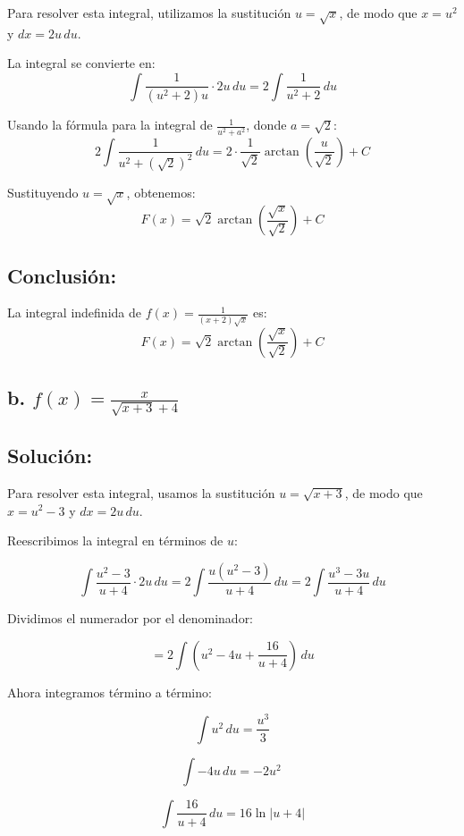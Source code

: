 \documentclass{article}
\begin{document}
Para resolver esta integral, utilizamos la sustitución \( u = \sqrt{x} \), de modo que \( x = u^2 \) y \( dx = 2u \, du \).

La integral se convierte en:
\[
\int \frac{1}{(u^2 + 2)u} \cdot 2u \, du = 2 \int \frac{1}{u^2 + 2} \, du
\]

Usando la fórmula para la integral de \( \frac{1}{u^2 + a^2} \), donde \( a = \sqrt{2} \):
\[
2 \int \frac{1}{u^2 + (\sqrt{2})^2} \, du = 2 \cdot \frac{1}{\sqrt{2}} \arctan\left( \frac{u}{\sqrt{2}} \right) + C
\]

Sustituyendo \( u = \sqrt{x} \), obtenemos:
\[
F(x) = \sqrt{2} \arctan\left( \frac{\sqrt{x}}{\sqrt{2}} \right) + C
\]

\subsection*{Conclusión:}

La integral indefinida de \( f(x) = \frac{1}{(x+2)\sqrt{x}} \) es:
\[
F(x) = \sqrt{2} \arctan\left( \frac{\sqrt{x}}{\sqrt{2}} \right) + C
\]

\subsection*{\newline b. \(f(x) = \frac{x}{\sqrt{x+3} + 4}\)}
\subsection*{Solución: }

Para resolver esta integral, usamos la sustitución \( u = \sqrt{x+3} \), de modo que \( x = u^2 - 3 \) y \( dx = 2u \, du \).

\noindent \newline Reescribimos la integral en términos de \( u \):

\[
\int \frac{u^2 - 3}{u + 4} \cdot 2u \, du = 2 \int \frac{u(u^2 - 3)}{u + 4} \, du = 2 \int \frac{u^3 - 3u}{u + 4} \, du
\]

\noindent Dividimos el numerador por el denominador:

\[
= 2 \int \left( u^2 - 4u + \frac{16}{u+4} \right) \, du
\]

\noindent Ahora integramos término a término:

\[
\int u^2 \, du = \frac{u^3}{3}
\]

\[
\int -4u \, du = -2u^2\
\]

\[
\int \frac{16}{u+4} \, du = 16 \ln|u+4|
\]
\end{document}
